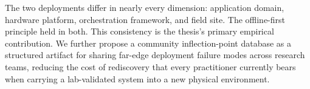 The two deployments differ in nearly every dimension: application domain, hardware platform, orchestration framework, and field site. The offline-first principle held in both. This consistency is the thesis's primary empirical contribution. We further propose a community inflection-point database as a structured artifact for sharing far-edge deployment failure modes across research teams, reducing the cost of rediscovery that every practitioner currently bears when carrying a lab-validated system into a new physical environment.

